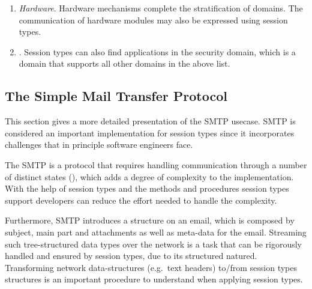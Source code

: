 \begin{enumerate}



	\item	{\em Hardware}.
	Hardware mechanisms complete the stratification of domains.
	The communication of hardware modules may also be expressed
	using session types.


	\item	{}.
	Session types can also find applications in the security domain,
	which is a domain that supports all other domains in the above list.

\end{enumerate}



\subsection{The Simple Mail Transfer Protocol}

This section gives a more detailed presentation of the SMTP
usecase. SMTP is considered an important implementation for
session types since it incorporates challenges that in principle
software engineers face.

The SMTP is a protocol that requires handling
communication through a number of distinct states (),
which adds a degree of complexity to the implementation.
With the help of session types and the methods and procedures
session types support developers can reduce the effort
needed to handle the complexity.

Furthermore, SMTP introduces a structure on an email,
which is composed by subject, main part and attachments
as well as meta-data for the email. Streaming such 
tree-structured data types over the network is a task that
can be rigorously handled and ensured by session types,
due to its structured natured. Transforming
network data-structures (e.g.~text headers)
to/from session types structures is an important
procedure to understand when applying session types. 

